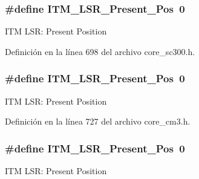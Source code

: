 \subsubsection[{\texorpdfstring{I\+T\+M\+\_\+\+L\+S\+R\+\_\+\+Present\+\_\+\+Pos}{ITM_LSR_Present_Pos}}]{\setlength{\rightskip}{0pt plus 5cm}\#define I\+T\+M\+\_\+\+L\+S\+R\+\_\+\+Present\+\_\+\+Pos~0}\hypertarget{group___c_m_s_i_s___i_t_m_gaf5740689cf14564d3f3fd91299b6c88d}{}\label{group___c_m_s_i_s___i_t_m_gaf5740689cf14564d3f3fd91299b6c88d}
I\+TM L\+SR\+: Present Position 

Definición en la línea 698 del archivo core\+\_\+sc300.\+h.

\subsubsection[{\texorpdfstring{I\+T\+M\+\_\+\+L\+S\+R\+\_\+\+Present\+\_\+\+Pos}{ITM_LSR_Present_Pos}}]{\setlength{\rightskip}{0pt plus 5cm}\#define I\+T\+M\+\_\+\+L\+S\+R\+\_\+\+Present\+\_\+\+Pos~0}\hypertarget{group___c_m_s_i_s___i_t_m_gaf5740689cf14564d3f3fd91299b6c88d}{}\label{group___c_m_s_i_s___i_t_m_gaf5740689cf14564d3f3fd91299b6c88d}
I\+TM L\+SR\+: Present Position 

Definición en la línea 727 del archivo core\+\_\+cm3.\+h.

\subsubsection[{\texorpdfstring{I\+T\+M\+\_\+\+L\+S\+R\+\_\+\+Present\+\_\+\+Pos}{ITM_LSR_Present_Pos}}]{\setlength{\rightskip}{0pt plus 5cm}\#define I\+T\+M\+\_\+\+L\+S\+R\+\_\+\+Present\+\_\+\+Pos~0}\hypertarget{group___c_m_s_i_s___i_t_m_gaf5740689cf14564d3f3fd91299b6c88d}{}\label{group___c_m_s_i_s___i_t_m_gaf5740689cf14564d3f3fd91299b6c88d}
I\+TM L\+SR\+: Present Position 

